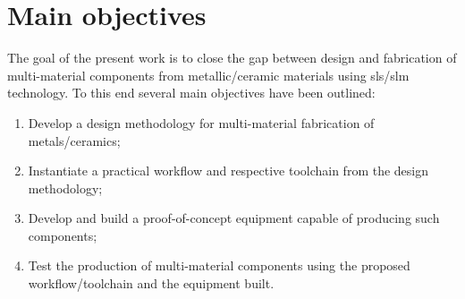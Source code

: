 %
\section{Main objectives}
The goal of the present work is to close the gap between design and fabrication of
multi-material components from metallic/ceramic materials using
\gls{sls}/\gls{slm} technology. To this end several main objectives have been
outlined:
\begin{enumerate}
  \item Develop a design methodology for multi-material fabrication of
    metals/ceramics;
  \item Instantiate a practical workflow and respective toolchain from the
    design methodology;
  \item Develop and build a proof-of-concept equipment capable of producing
    such components;
  \item Test the production of multi-material components using the proposed
    workflow/toolchain and the equipment built.
\end{enumerate}
